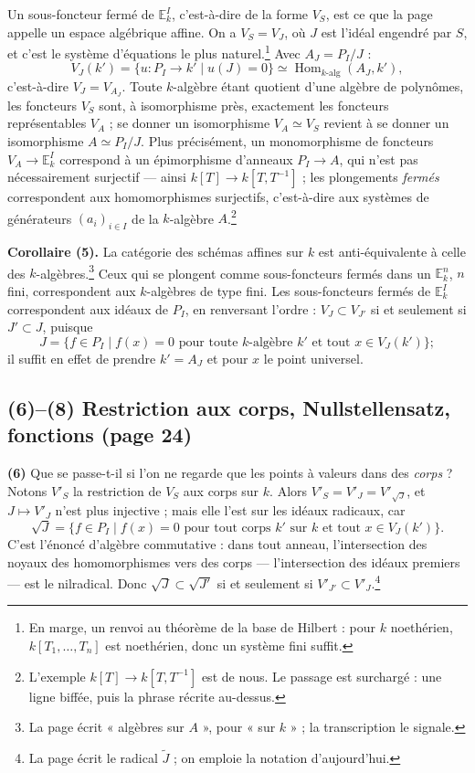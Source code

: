 \documentclass[11pt,a4paper]{article}
\begin{document}
Un sous-foncteur fermé de $\mathbb{E}^I_k$, c'est-à-dire de la forme $V_S$, est
ce que la page appelle un espace algébrique affine. On a $V_S = V_J$, où $J$ est
l'idéal engendré par $S$, et c'est le système d'équations le plus
naturel.\footnote{En marge, un renvoi au théorème de la base de Hilbert : pour
$k$ noethérien, $k[T_1, \ldots, T_n]$ est noethérien, donc un système fini
suffit.} Avec $A_J = P_I / J$ :
\[
V_J(k') = \{ u : P_I \to k' \mid u(J) = 0 \} \simeq \operatorname{Hom}_{k\text{-alg}}(A_J, k') ,
\]
c'est-à-dire $V_J = V_{A_J}$. Toute $k$-algèbre étant quotient d'une algèbre de
polynômes, les foncteurs $V_S$ sont, à isomorphisme près, exactement les
foncteurs représentables $V_A$ ; se donner un isomorphisme $V_A \simeq V_S$
revient à se donner un isomorphisme $A \simeq P_I / J$. Plus précisément, un
monomorphisme de foncteurs $V_A \to \mathbb{E}^I_k$ correspond à un épimorphisme
d'anneaux $P_I \to A$, qui n'est pas nécessairement surjectif --- ainsi
$k[T] \to k[T, T^{-1}]$ ; les plongements \emph{fermés} correspondent aux
homomorphismes surjectifs, c'est-à-dire aux systèmes de générateurs
$(a_i)_{i \in I}$ de la $k$-algèbre $A$.\footnote{L'exemple
$k[T] \to k[T, T^{-1}]$ est de nous. Le passage est surchargé : une ligne biffée,
puis la phrase récrite au-dessus.}

\textbf{Corollaire (5).} La catégorie des schémas affines sur $k$ est
anti-équivalente à celle des $k$-algèbres.\footnote{La page écrit « algèbres
sur $A$ », pour « sur $k$ » ; la transcription le signale.} Ceux qui se
plongent comme sous-foncteurs fermés dans un $\mathbb{E}^n_k$, $n$ fini,
correspondent aux $k$-algèbres de type fini. Les sous-foncteurs fermés de
$\mathbb{E}^I_k$ correspondent aux idéaux de $P_I$, en renversant l'ordre :
$V_J \subset V_{J'}$ si et seulement si $J' \subset J$, puisque
\[
J = \{ f \in P_I \mid f(x) = 0 \text{ pour toute } k\text{-algèbre } k' \text{ et tout } x \in V_J(k') \} ;
\]
il suffit en effet de prendre $k' = A_J$ et pour $x$ le point universel.

\subsection*{(6)--(8) Restriction aux corps, Nullstellensatz, fonctions (page 24)}

\textbf{(6)} Que se passe-t-il si l'on ne regarde que les points à valeurs dans
des \emph{corps} ? Notons $V'_S$ la restriction de $V_S$ aux corps sur $k$.
Alors $V'_S = V'_J = V'_{\sqrt{J}}$, et $J \mapsto V'_J$ n'est plus injective ;
mais elle l'est sur les idéaux radicaux, car
\[
\sqrt{J} = \{ f \in P_I \mid f(x) = 0 \text{ pour tout corps } k' \text{ sur } k \text{ et tout } x \in V_J(k') \} .
\]
C'est l'énoncé d'algèbre commutative : dans tout anneau, l'intersection des
noyaux des homomorphismes vers des corps --- l'intersection des idéaux premiers
--- est le nilradical. Donc $\sqrt{J} \subset \sqrt{J'}$ si et seulement si
$V'_{J'} \subset V'_J$.\footnote{La page écrit le radical $\widetilde{J}$ ; on
emploie la notation d'aujourd'hui.}
\end{document}
